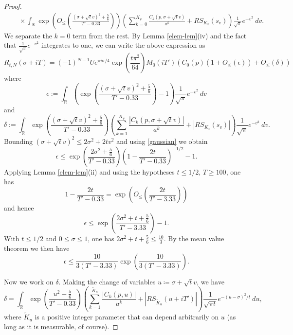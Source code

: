 \documentclass[a4paper,11pt,twoside]{amsart}
\newcommand\R{\mathbb{R}}
\begin{document}
\begin{proof}
\begin{align*}
&\quad \times \int_\R \exp\left( O_{\leq}\left(\frac{(\sigma + \sqrt{t} v)^2 + \frac{5}{6}}{T'-0.33} \right) \right) \left(\sum_{k=0}^{K_v} \frac{C_k(p,\sigma + \sqrt{t} v)}{a^k} + RS_{K_v}(s_v)\right) \frac{1}{\sqrt{\pi}} e^{-v^2}\ dv.
\end{align*}
We separate the $k=0$ term from the rest.
By Lemma \ref{elem-lem}(iv) and the fact that $\frac{1}{\sqrt{\pi}} e^{-v^2}$ integrates to one, we can write the above expression as
\begin{equation}\label{rtnst}
 R_{t,N}(\sigma+iT) = (-1)^{N-1} U e^{\pi i \sigma/4} \exp\left( \frac{t \pi^2}{64}\right) M_0(iT') \left( C_0(p) (1 + O_{\leq}(\epsilon)) + O_{\leq}(\delta) \right)
\end{equation}
where
$$ \epsilon := \int_\R \left( \exp\left( \frac{(\sigma + \sqrt{t} v)^2 + \frac{5}{6} }{T'-0.33} \right)  - 1\right) \frac{1}{\sqrt{\pi}} e^{-v^2}\ dv$$
and
$$ \delta := \int_\R \exp\left( \frac{(\sigma + \sqrt{t} v)^2 + \frac{5}{6}}{T'-0.33} \right) \left(\sum_{k=1}^{K_v} \frac{|C_k(p,\sigma+\sqrt{t}v)|}{a^k} + |RS_{K_v}(s_v)|\right) \frac{1}{\sqrt{\pi}} e^{-v^2}\ dv.$$
Bounding $(\sigma + \sqrt{t} v)^2 \leq 2 \sigma^2 + 2 t v^2$ and using \eqref{gaussian} we obtain
$$ \epsilon \leq \exp\left( \frac{2\sigma^2 + \frac{5}{6}}{T'-0.33} \right) \left(1 - \frac{2t}{T'-0.33}\right)^{-1/2} - 1.$$
Applying Lemma \ref{elem-lem}(ii) and using the hypotheses $t \leq 1/2$, $T \geq 100$, one has
$$ 1 - \frac{2t}{T'-0.33} = \exp\left( O_{\leq}\left( \frac{2t}{T'-3.33} \right)\right)$$
and hence
$$
 \epsilon \leq \exp\left( \frac{2\sigma^2 + t + \frac{5}{6}}{T'-3.33} \right) - 1.
$$
With $t \leq 1/2$ and $0 \leq \sigma \leq 1$, one has $2\sigma^2 + t + \frac{5}{6} \leq \frac{10}{3}$.  By the mean value theorem we then have
\begin{equation}\label{eep}
 \epsilon \leq \frac{10}{3(T'-3.33)} \exp\left( \frac{10}{3(T'-3.33)}\right).
\end{equation}

Now we work on $\delta$.  Making the change of variables $u \coloneqq \sigma + \sqrt{t} v$, we have
$$ \delta = \int_\R \exp\left( \frac{u^2 + \frac{5}{6}}{T'-0.33} \right) \left(\sum_{k=1}^{\tilde K_u} \frac{|C_k(p,u)|}{a^k} + |RS_{\tilde K_u}(u + iT')|\right) \frac{1}{\sqrt{\pi t}} e^{-(u-\sigma)^2/t}\ du,$$
where $\tilde K_u$ is a positive integer parameter that can depend arbitrarily on $u$ (as long as it is measurable, of course).  


\end{proof}
\end{document}
